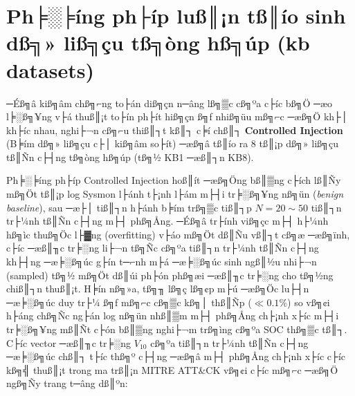 ﻿\documentclass[../main.tex]{subfiles}
\begin{document}
\section{Ph╞░╞íng ph├íp luß║¡n tß║ío sinh dß╗» liß╗çu tß╗òng hß╗úp (kb datasets)}
\label{section:2.3}

─Éß╗â kiß╗âm chß╗⌐ng to├án diß╗çn n─âng lß╗▒c cß╗ºa c├íc bß╗Ö ─æo l╞░ß╗¥ng v├á thuß║¡t to├ín ph├ít hiß╗çn ß╗ƒ nhiß╗üu mß╗⌐c ─æß╗Ö kh├│ kh├íc nhau, nghi├¬n cß╗⌐u thiß║┐t kß║┐ c╞í chß║┐ \textbf{Controlled Injection} (B╞ím dß╗» liß╗çu c├│ kiß╗âm so├ít) ─æß╗â tß║ío ra 8 tß║¡p dß╗» liß╗çu tß║Ñn c├┤ng tß╗òng hß╗úp (tß╗½ KB1 ─æß║┐n KB8). 

Ph╞░╞íng ph├íp Controlled Injection hoß║ít ─æß╗Öng bß║▒ng c├ích lß║Ñy mß╗Öt tß║¡p log Sysmon l├ánh t├¡nh l├ám m├┤i tr╞░ß╗¥ng nß╗ün (\textit{benign baseline}), sau ─æ├│ tiß║┐n h├ánh b╞ím trß╗▒c tiß║┐p $N = 20 \sim 50$ tiß║┐n tr├¼nh tß║Ñn c├┤ng m├┤ phß╗Ång. ─Éß╗â tr├ính viß╗çc m├┤ h├¼nh hß╗ìc thuß╗Öc l├▓ng (overfitting) v├áo mß╗Öt dß║Ñu vß║┐t cß╗æ ─æß╗ïnh, c├íc ─æß║╖c tr╞░ng li├¬n tß╗Ñc cß╗ºa tiß║┐n tr├¼nh tß║Ñn c├┤ng kh├┤ng ─æ╞░ß╗úc g├ín t─⌐nh m├á ─æ╞░ß╗úc sinh ngß║½u nhi├¬n (sampled) tß╗½ mß╗Öt dß║úi ph├ón phß╗æi ─æß║╖c tr╞░ng cho tß╗½ng chiß║┐n thuß║¡t. H╞ín nß╗»a, tß╗╖ lß╗ç lß╗¢p m├ú ─æß╗Öc lu├┤n ─æ╞░ß╗úc duy tr├¼ ß╗ƒ mß╗⌐c cß╗▒c kß╗│ thß║Ñp ($\ll 0.1\%$) so vß╗¢i h├áng chß╗Ñc ng├án log nß╗ün nhß║▒m m├┤ phß╗Ång ch├¡nh x├íc m├┤i tr╞░ß╗¥ng mß║Ñt c├ón bß║▒ng nghi├¬m trß╗ìng cß╗ºa SOC thß╗▒c tß║┐. C├íc vector ─æß║╖c tr╞░ng $V_{10}$ cß╗ºa tiß║┐n tr├¼nh tß║Ñn c├┤ng ─æ╞░ß╗úc chß║┐ t├íc thß╗º c├┤ng ─æß╗â m├┤ phß╗Ång ch├¡nh x├íc c├íc kß╗╣ thuß║¡t trong ma trß║¡n MITRE ATT\&CK vß╗¢i c├íc mß╗⌐c ─æß╗Ö ngß╗Ñy trang t─âng dß║ºn:
\end{document}

